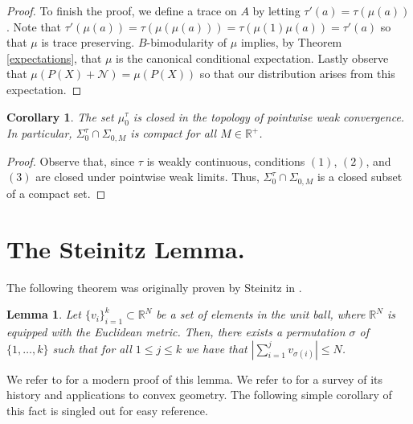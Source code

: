 \documentclass[11pt]{amsart}
\newtheorem{lemma}[theorem]{Lemma}
\newtheorem{corollary}[theorem]{Corollary}
\begin{document}
\begin{proof}
To finish the proof, we define a trace on $A$ by letting $\tau'(a) = \tau(\mu(a))$.  Note that $\tau'(\mu(a)) = \tau(\mu(\mu(a))) = \tau(\mu(1) \mu(a)) = \tau'(a)$
 so that $\mu$ is trace preserving.
$B$-bimodularity of $\mu$ implies, by Theorem \ref{expectations}, that $\mu$ is the canonical conditional expectation.
Lastly observe that $\mu(P(X) + \mathcal{N}) = \mu(P(X))$ so that our distribution arises from this expectation.

\end{proof}

\begin{corollary}\label{compact_corr}
 The set $\mu_{0}^{\tau}$ is closed in the topology of pointwise weak convergence.  In particular, $\Sigma_{0}^{\tau} \cap \Sigma_{0,M}$ is compact for
all $M \in \mathbb{R}^{+}$.
\end{corollary}

\begin{proof}
 Observe that, since $\tau$ is weakly continuous, conditions $(1)$, $(2)$, and $(3)$ are closed under pointwise weak limits.
Thus, $\Sigma_{0}^{\tau} \cap \Sigma_{0,M}$ is a closed subset of a compact set.
\end{proof}



\section{The Steinitz Lemma.}
The following theorem was originally proven by Steinitz in \cite{steinitz3}.
\begin{lemma}
Let $\{v_{i} \}_{i=1}^{k} \subset \mathbb{R}^{N}$ be a set of elements in the unit ball, where $\mathbb{R}^{N}$ is equipped
with the Euclidean metric.  Then, there exists a permutation $\sigma$ of $\{1,\ldots, k \}$ such that
for all $1\leq j \leq k$ we have that $|\sum_{i=1}^{j} v_{\sigma(i)}| \leq N$.
\end{lemma}
We refer to \cite{steinitz2} for a modern proof of this lemma.  We refer to \cite{steinitz} for a survey of its history
and applications to convex geometry.  The following simple corollary of this fact is singled out for easy reference.
\end{document}
